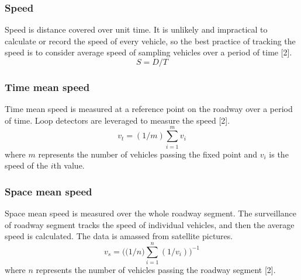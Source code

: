 \documentclass[12pt,a4paper]{report}
\begin{document}
	\subsubsection*{Speed}
	Speed is distance covered over unit time. It is unlikely and impractical to calculate or record the speed of every vehicle, so the best practice of tracking the speed is to consider average speed of sampling vehicles over a period of time [2].
	$$S = D/T$$
	\subsubsection*{Time mean speed}
	Time mean speed is measured at a reference point on the roadway over a period of time. Loop detectors are leveraged to measure the speed [2].
	$$v_t = (1/m)\sum_{i=1}^{m}v_i$$
	where $m$ represents the number of vehicles passing the fixed point and $v_i$ is the speed of the $i$th value.
	\subsubsection*{Space mean speed}
	Space mean speed is measured over the whole roadway segment. The surveillance of roadway segment tracks the speed of individual vehicles, and then the average speed is calculated. The data is amassed from satellite pictures.
	$$v_s = \Big(\big(1/n\big)\sum_{i=1}^{n}(1/v_i)\Big)^{-1}$$
	where $n$ represents the number of vehicles passing the roadway segment [2].
\end{document}
